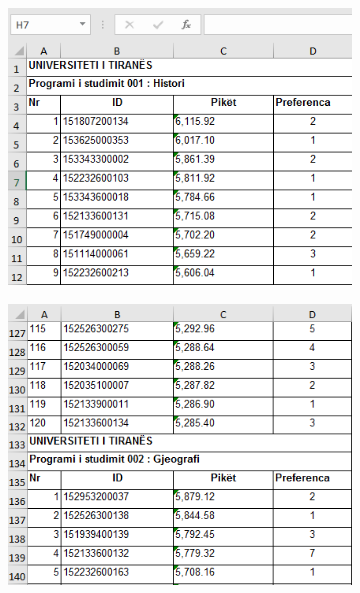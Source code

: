 \documentclass{article}
\begin{document}
\begin{figure}[h]
	\centering
	\caption{Irregular records}
	\label{fig:irr-records}
	\begin{subfigure}{0.4\linewidth}
		\centering
		\includegraphics[width=\textwidth]{../Figures/excel_1.png}
	\end{subfigure}
	\hfill
	\begin{subfigure}{0.4\linewidth}
		\centering
		\includegraphics[width=\textwidth]{../Figures/excel_2.png}
	\end{subfigure}	
\end{figure}
\end{document}
